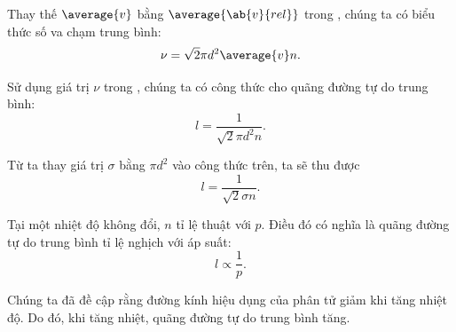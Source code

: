 Thay thế $\average{v}$ bằng $\average{\ab{v}{rel}}$ trong , chúng ta có biểu thức số va chạm trung bình: 
\begin{equation}\label{eq:16_9}
    \nu = \sqrt{2}\pi d^2 \average{v} n.
\end{equation}

\noindent
Sử dụng giá trị $\nu$ trong , chúng ta có công thức cho quãng đường tự do trung bình:
\begin{equation}\label{eq:16_10}
    l = \frac{1}{\sqrt{2}\pi d^2 n}.
\end{equation}

\noindent
Từ  ta thay giá trị $\sigma$ bằng $\pi d^2$ vào công thức trên, ta sẽ thu được
\begin{equation}\label{eq:16_11}
    l = \frac{1}{\sqrt{2}\sigma n}.
\end{equation}

Tại một nhiệt độ không đổi, $n$ tỉ lệ thuật với $p$. Điều đó có nghĩa là quãng đường tự do trung bình tỉ lệ nghịch với áp suất:
\begin{equation}\label{eq:16_12}
    l \propto \frac{1}{p}.
\end{equation}

\noindent
Chúng ta đã đề cập rằng đường kính hiệu dụng của phân tử giảm khi tăng nhiệt độ. Do đó, khi tăng nhiệt, quãng đường tự do trung bình tăng.

